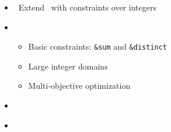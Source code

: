 \begin{frame}{\clingcon}
  \begin{itemize}
  \item {} \ Extend \clingo\ with constraints over integers
  \item {} \
    \begin{itemize}
    \item Basic constraints: \lstinline{&sum} and \lstinline{&distinct}
    \item Large integer domains
    \item Multi-objective optimization
    \end{itemize}
  \item {} \ \cite{bakaossc16a}
  \item {} \ \cite{?}
  \end{itemize}
\end{frame}
%

